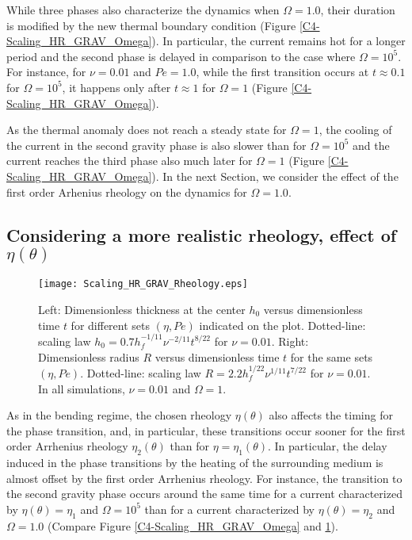While three  phases also characterize the  dynamics when $\Omega=1.0$,
their  duration is  modified  by the  new  thermal boundary  condition
(Figure \ref{C4-Scaling_HR_GRAV_Omega}).   In particular,  the current
remains hot  for a longer  period and the  second phase is  delayed in
comparison  to  the case  where  $\Omega  =10^5$.  For  instance,  for
$\nu=0.01$  and  $Pe=1.0$,  while   the  first  transition  occurs  at
$t \approx 0.1$ for $\Omega=10^5$,  it happens only after $t\approx 1$
for $\Omega=1$ (Figure \ref{C4-Scaling_HR_GRAV_Omega}).

As the thermal  anomaly does not reach a steady  state for $\Omega=1$,
the cooling of the current in  the second gravity phase is also slower
than for  $\Omega=10^5$ and the  current reaches the third  phase also
much later for $\Omega=1$ (Figure \ref{C4-Scaling_HR_GRAV_Omega}).  In
the next Section,  we consider the effect of the  first order Arhenius
rheology on the dynamics for $\Omega=1.0$.

\subsection{Considering   a  more   realistic   rheology,  effect   of
  $\eta(\theta)$}
\label{C4-sec:cons-more-real-1}
 
\begin{figure}[h!]
  \begin{center}
    \graphicspath{ {/Users/thorey/Documents/These/Projet/Refroidissement/Skin_Model/Figure/Figure_Heating/} }
    \texttt{[image: Scaling\_HR\_GRAV\_Rheology.eps]}
    \caption{Left: Dimensionless thickness at  the center $h_0$ versus
      dimensionless time $t$ for  different sets $(\eta,Pe)$ indicated
      on      the      plot.        Dotted-line:      scaling      law
      $h_0= 0.7h_f^{-1/11}\nu^{-2/11}t^{8/22}$ for $\nu=0.01$.  Right:
      Dimensionless radius  $R$ versus dimensionless time  $t$ for the
      same    sets    $(\eta,Pe)$.      Dotted-line:    scaling    law
      $R=  2.2h_f^{1/22}\nu^{1/11}t^{7/22}$ for  $\nu  =0.01$. In  all
      simulations, $\nu=0.01$ and $\Omega=1$.}
    \label{C4-HR_GRAV_Rheology}
  \end{center}
\end{figure}

As  in the  bending regime,  the chosen  rheology $\eta(\theta)$  also
affects the timing for the phase transition, and, in particular, these
transitions  occur  sooner  for  the first  order  Arrhenius  rheology
$\eta_2(\theta)$ than  for $\eta=\eta_1(\theta)$.  In  particular, the
delay  induced  in  the  phase  transitions  by  the  heating  of  the
surrounding  medium is  almost  offset by  the  first order  Arrhenius
rheology.  For  instance, the transition  to the second  gravity phase
occurs  around   the  same  time   for  a  current   characterized  by
$\eta(\theta)   =\eta_1$   and   $\Omega=10^5$  than   for   a   current
characterized  by  $\eta(\theta)  =\eta_2$ and  $\Omega=1.0$  (Compare
Figure \ref{C4-Scaling_HR_GRAV_Omega} and \ref{C4-HR_GRAV_Rheology}).

